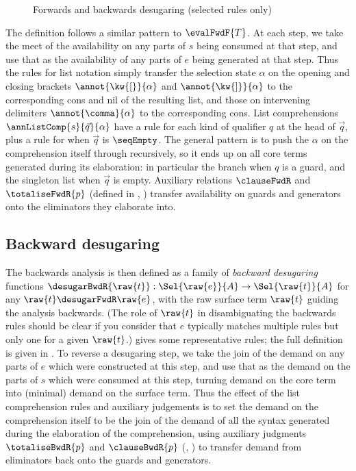 \begin{figure}
   
   \caption{Forwards and backwards desugaring (selected rules only)}
   \label{fig:surface-language:desugar}
\end{figure}

The definition follows a similar pattern to $\evalFwdF{T}$. At each step, we take the meet of the availability on any parts of $s$ being consumed at that step, and use that as the availability of any parts of $e$ being generated at that step. Thus the rules for list notation simply transfer the selection state $\alpha$ on the opening and closing brackets $\annot{\kw{[}}{\alpha}$ and $\annot{\kw{]}}{\alpha}$ to the corresponding cons and nil of the resulting list, and those on intervening delimiters $\annot{\comma}{\alpha}$ to the corresponding cons. List comprehensions $\annListComp{s}{\vec{q}}{\alpha}$ have a rule for each kind of qualifier $q$ at the head of $\vec{q}$, plus a rule for when $\vec{q}$ is $\seqEmpty$. The general pattern is to push the $\alpha$ on the comprehension itself through recursively, so it ends up on all core terms generated during its elaboration: in particular the  branch when $q$ is a guard, and the singleton list when $\vec{q}$ is empty. Auxiliary relations $\clauseFwdR$ and $\totaliseFwdR{p}$ (\ifappendices defined in , \else \IncludedWithSupplementaryMaterial\fi) transfer availability on guards and generators onto the eliminators they elaborate into.

\subsection{Backward desugaring}

The backwards analysis is then defined as a family of \textit{backward desugaring} functions $\desugarBwdR{\raw{t}}: \Sel{\raw{e}}{A} \to \Sel{\raw{t}}{A}$ for any $\raw{t} \desugarFwdR \raw{e}$, with the raw surface term $\raw{t}$ guiding the analysis backwards. (The role of $\raw{t}$ in disambiguating the backwards rules should be clear if you consider that $e$ typically matches multiple rules but only one for a given $\raw{t}$.)  gives some representative rules; the full definition is {\ifappendices given in  \else \IncludedWithSupplementaryMaterial.\fi} To reverse a desugaring step, we take the join of the demand on any parts of $e$ which were constructed at this step, and use that as the demand on the parts of $s$ which were consumed at this step, turning demand on the core term into (minimal) demand on the surface term. Thus the effect of the list comprehension rules and auxiliary judgements is to set the demand on the comprehension itself to be the join of the demand of all the syntax generated during the elaboration of the comprehension, using auxiliary judgments $\totaliseBwdR{p}$ and $\clauseBwdR{p}$ \ifappendices (, ) \fi to transfer demand from eliminators back onto the guards and generators.

